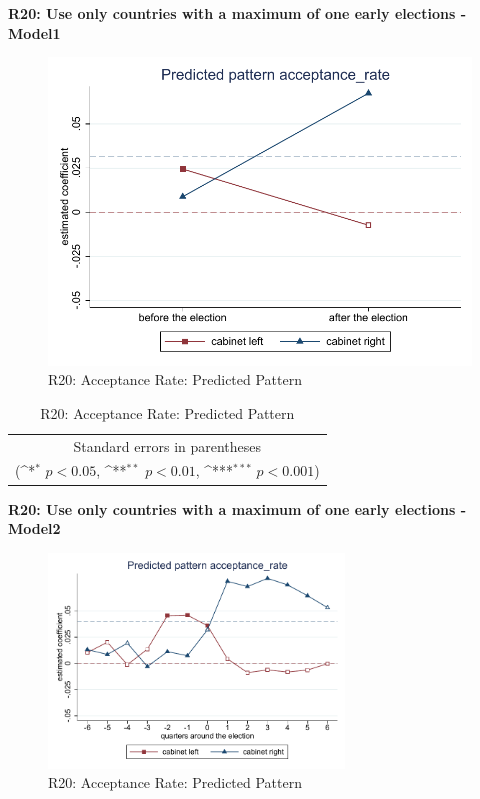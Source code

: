 \documentclass[10pt,a4paper]{scrartcl}
\begin{document}
\clearpage
\textbf{R20: Use only countries with a maximum of one early elections - Model1}
\begin{figure}[!ht]
	\centering
	\includegraphics[width=1\textwidth]{figures_edited/acceptance_rate_graph1_R20.pdf}
	\caption{R20: Acceptance Rate: Predicted Pattern}
\end{figure}

\begin{table}[!ht]\centering
	\renewcommand{\arraystretch}{1.25}
	\def\sym#1{\ifmmode^{#1}\else\(^{#1}\)\fi}
	\caption{R20: Acceptance Rate: Predicted Pattern}
	\begin{tabular}{l*{2}{c}}
		\hline\hline
		
		\hline\hline
		\multicolumn{3}{c}{\footnotesize Standard errors in parentheses} \\
		\multicolumn{3}{c}{\footnotesize (\sym{*} \(p<0.05\), \sym{**} \(p<0.01\), \sym{***} \(p<0.001\))}\\
	\end{tabular}
\end{table}

\clearpage
\textbf{R20: Use only countries with a maximum of one early elections - Model2}
\begin{figure}[!ht]
	\centering
	\includegraphics[width=0.7\textwidth]{figures_edited/acceptance_rate_graph2_R20.pdf}
	\caption{R20: Acceptance Rate: Predicted Pattern}
\end{figure}
\end{document}
